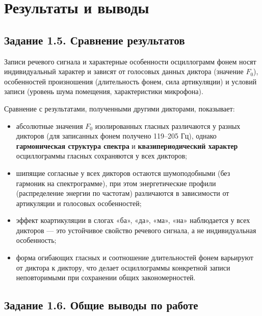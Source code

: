 \section{Результаты и выводы}

\subsection{Задание 1.5. Сравнение результатов}

Записи речевого сигнала и характерные особенности осциллограмм фонем
носят индивидуальный характер и зависят от голосовых данных диктора
(значение $F_0$), особенностей произношения (длительность фонем,
сила артикуляции) и условий записи (уровень шума помещения,
характеристики микрофона).

Сравнение с результатами, полученными другими дикторами, показывает:
\begin{itemize}
	\item абсолютные значения $F_0$ изолированных гласных различаются
		у разных дикторов (для записанных фонем получено 119--205 Гц),
		однако \textbf{гармоническая структура спектра} и
		\textbf{квазипериодический характер} осциллограммы гласных
		сохраняются у всех дикторов;
	\item шипящие согласные у всех дикторов остаются
		шумоподобными (без гармоник на спектрограмме), при этом
		энергетические профили (распределение энергии по частотам)
		различаются в зависимости от артикуляции и голосовых
		особенностей;
	\item эффект коартикуляции в слогах «ба», «да», «ма», «на»
		наблюдается у всех дикторов --- это устойчивое свойство
		речевого сигнала, а не индивидуальная особенность;
	\item форма огибающих гласных и соотношение длительностей фонем
		варьируют от диктора к диктору, что делает осциллограммы
		конкретной записи неповторимыми при сохранении общих
		закономерностей.
\end{itemize}

\subsection{Задание 1.6. Общие выводы по работе}

